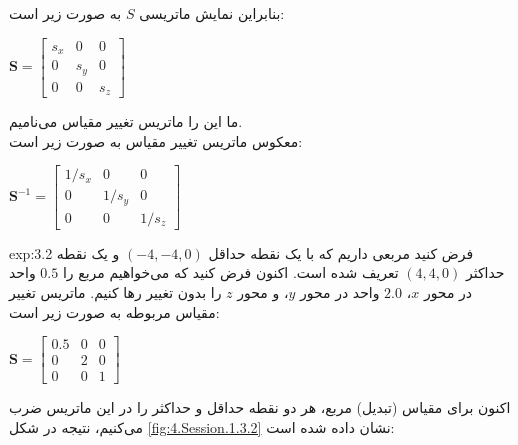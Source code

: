 {\begin{spacing}{1.5}
        بنابراین نمایش ماتریسی $S$ به صورت زیر است:

        \begin{center}
            $\textbf{S}=\begin{bmatrix}
                            s_x & 0   & 0   \\
                            0   & s_y & 0   \\
                            0   & 0   & s_z
            \end{bmatrix}$
        \end{center}

        ما این را ماتریس تغییر مقیاس می‌نامیم.\\
        معکوس ماتریس تغییر مقیاس به صورت زیر است:

        \begin{center}
            $\textbf{S}^{-1}=\begin{bmatrix}
                                 1/s_x & 0     & 0     \\
                                 0     & 1/s_y & 0     \\
                                 0     & 0     & 1/s_z
            \end{bmatrix}$
        \end{center}
        \begin{example}{exp:3.2}
            \Large
            فرض کنید مربعی داریم که با یک نقطه حداقل $(-4,-4, 0)$ و یک نقطه حداکثر $(4,4,0)$ تعریف شده است.
            اکنون فرض کنید که می‌خواهیم مربع را $0.5$ واحد در محور $x$، $2.0$ واحد در محور $y$، و محور $z$ را بدون تغییر رها کنیم.
            ماتریس تغییر مقیاس مربوطه به صورت زیر است:

            \begin{center}
                $\textbf{S}=\begin{bmatrix}
                                0.5 & 0 & 0 \\
                                0   & 2 & 0 \\
                                0   & 0 & 1
                \end{bmatrix}$
            \end{center}

            اکنون برای مقیاس (تبدیل) مربع، هر دو نقطه حداقل و حداکثر را در این ماتریس ضرب می‌کنیم، نتیجه در شکل \ref{fig:4.Session.1.3.2} نشان داده شده است:


\end{example}
\end{spacing}}
